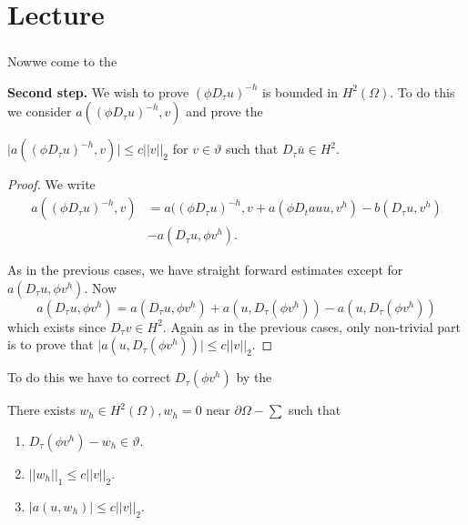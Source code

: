 \chapter{Lecture}\label{lec22}%
\setcounter{section}{11}

\subsection{}\label{lec22:sec11:subsec3}
Now\pageoriginale we come to the

\noindent \textbf{Second step.} 
  We wish to prove $(\phi D_\tau u)^{-h} $ is
  bounded in $H^2 (\Omega)$. To do this we consider $a((\phi D_\tau
  u)^{-h}, v)$ and prove the 
  \begin{lemma}\label{lec22:sec11:subsec3:lem11.6} %
    $\big | a(( \phi D_\tau u )^{-h}, v ) \big | \leq c || v ||_2$ for $v
    \in \vartheta$ such that $D_\tau \bar{u} \in H^2$.  
  \end{lemma}
  
  \begin{proof} %
    We write
    \begin{align*}
      a((\phi D_\tau u)^{-h}, v ) & = a((\phi D_\tau u)^{-h}, v + a(\phi
      D_tau u, v^h) - b(D_\tau u, v^h)\\ 
      & - a(D_\tau u, \phi v^h). 
    \end{align*}
    
    As in the previous cases, we have straight forward estimates except
    for $a(D_\tau u, \phi v^h)$. Now 
    $$
    a(D_\tau u, \phi v^h) = a (D_\tau u, \phi v^h) + a(u, D_\tau (\phi
    v^h)) - a (u, D_\tau (\phi v^h)) 
    $$
    which exists since $D_\tau v \in H^2$. Again as in the
    previous cases, only non-trivial part is to prove that $\big | a(u,
    D_\tau (\phi v^h)) \big | \leq c || v ||_2$.  
  \end{proof}

To do this we have to correct $D_\tau (\phi v^h)$ by the
\begin{lemma}\label{lec22:sec11:subsec3:lem11.7} %
There exists $w_h \in H^2 (\Omega), w_h = 0$ near $\partial
\Omega - \sum$ such that  
\begin{enumerate}[\rm i)]
\item $D_\tau (\phi v^h) - w_h \in \vartheta$. 
\item $|| w_h ||_1 \leq c || v ||_2$. 
\item $\big | a(u, w_h ) \big | \leq c || v ||_2$. 
\end{enumerate}
\end{lemma}

